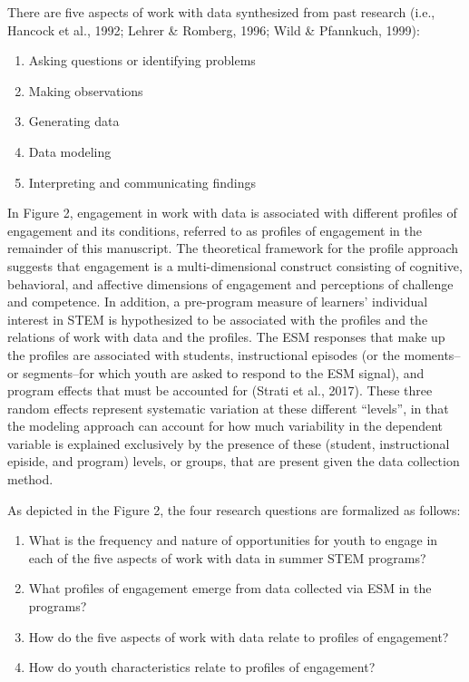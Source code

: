 \documentclass[]{book}
\providecommand{\tightlist}{%
  \setlength{\itemsep}{0pt}\setlength{\parskip}{0pt}}
\theoremstyle{definition}
\theoremstyle{definition}
\theoremstyle{definition}
\theoremstyle{remark}
\begin{document}
There are five aspects of work with data synthesized from past research
(i.e., Hancock et al., 1992; Lehrer \& Romberg, 1996; Wild \& Pfannkuch,
1999):

\begin{enumerate}
\def\labelenumi{\arabic{enumi}.}
\tightlist
\item
  Asking questions or identifying problems
\item
  Making observations
\item
  Generating data
\item
  Data modeling
\item
  Interpreting and communicating findings
\end{enumerate}

In Figure 2, engagement in work with data is associated with different
profiles of engagement and its conditions, referred to as profiles of
engagement in the remainder of this manuscript. The theoretical
framework for the profile approach suggests that engagement is a
multi-dimensional construct consisting of cognitive, behavioral, and
affective dimensions of engagement and perceptions of challenge and
competence. In addition, a pre-program measure of learners' individual
interest in STEM is hypothesized to be associated with the profiles and
the relations of work with data and the profiles. The ESM responses that
make up the profiles are associated with students, instructional
episodes (or the moments--or segments--for which youth are asked to
respond to the ESM signal), and program effects that must be accounted
for (Strati et al., 2017). These three random effects represent
systematic variation at these different ``levels'', in that the modeling
approach can account for how much variability in the dependent variable
is explained exclusively by the presence of these (student,
instructional episide, and program) levels, or groups, that are present
given the data collection method.

As depicted in the Figure 2, the four research questions are formalized
as follows:

\begin{enumerate}
\def\labelenumi{\arabic{enumi}.}
\tightlist
\item
  What is the frequency and nature of opportunities for youth to engage
  in each of the five aspects of work with data in summer STEM programs?
\item
  What profiles of engagement emerge from data collected via ESM in the
  programs?
\item
  How do the five aspects of work with data relate to profiles of
  engagement?
\item
  How do youth characteristics relate to profiles of engagement?
\end{enumerate}
\end{document}
